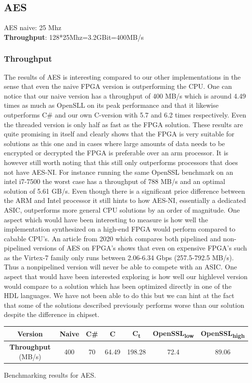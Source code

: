 \documentclass[a4paper]{article}
\begin{document}
\subsection{AES}
\label{sec:org33a8f40}
AES naive: 25 Mhz\\
\textbf{Throughput}: 128*25Mhz=3.2GBit=400MB/s
\subsubsection{Throughput}
\label{sec:orgedec285}
The results of AES is interesting compared to our other implementations in the sense that even the naive FPGA version is outperforming the CPU. One can notice that our naive version has a throughput of 400 MB/s which is around 4.49 times as much as OpenSLL on its peak performance and that it likewise outperforms C\# and our own C-version with 5.7 and 6.2 times respectively. Even the threaded version is only half as fast as the FPGA solution. These results are quite promising in itself and clearly shows that the FPGA is very suitable for solutions as this one and in cases where large amounts of data needs to be encrypted or decrypted the FPGA is preferable over an arm processor. It is however still worth noting that this still only outperforms processors that does not have AES-NI. For instance running the same OpenSSL benchmark on an intel i7-7500 the worst case has a throughput of 788 MB/s and an optimal solution of 5.61 GB/s. Even though there is a significant price difference between the ARM and Intel processor it still hints to how AES-NI, essentially a dedicated ASIC, outperforms more general CPU solutions by an order of magnitude. One aspect which would have been interesting to measure is how well the implementation synthesized on a high-end FPGA would perform compared to cabable CPU's. An article from 2020 which compares both pipelined and non-pipelined versions of AES on FPGA's shows that even on expensive FPGA's such as the Virtex-7 family only runs between 2.06-6.34 Gbps (257.5-792.5 MB/s)\cite{FPGA_AES}. Thus a nonpipelined version will never be able to compete with an ASIC. One aspect that would have been interested exploring is how well our highlevel version would compare to a solution which has been optimized directly in one of the HDL languages. We have not been able to do this but we can hint at the fact that some of the solutions described previously performs worse than our solution despite the difference in chipset.
\begin{table}[htbp]
\centering
\begin{tabular}{|c|c|c|c|c|c|c|}
\hline
\textbf{Version} & Naive & C\# & C & C\textsubscript{t} & OpenSSL\textsubscript{low} & OpenSSL\textsubscript{high}\\
\hline
\textbf{Throughput} (MB/s) & 400 & 70 & 64.49 & 198.28 & 72.4 & 89.06\\
\hline
\end{tabular}
Benchmarking results for AES.

\end{table}
\end{document}
